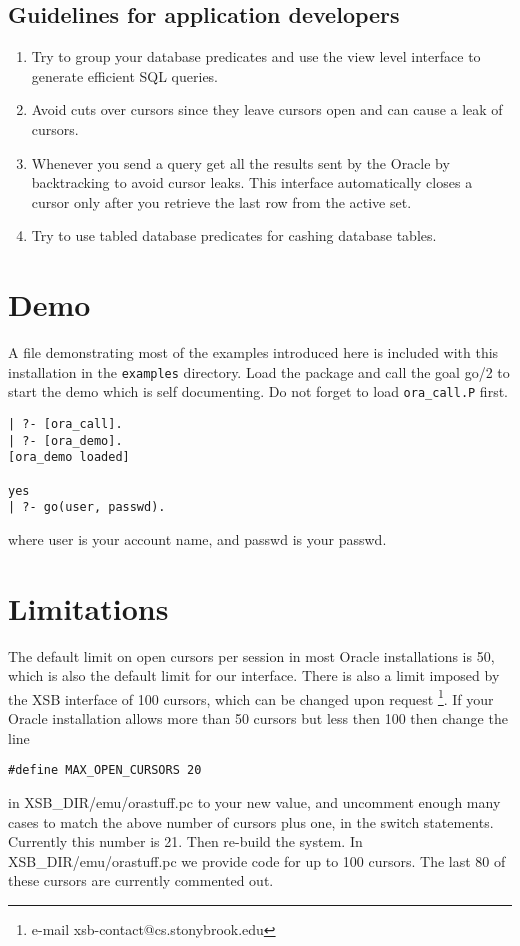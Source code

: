 \subsection{Guidelines for application developers} \label{sec:Guide}
\begin{enumerate}
\item  Try to group your database predicates and use the view level interface
   to generate efficient SQL queries.
\item  Avoid cuts over cursors since they leave cursors open and can cause
   a leak of cursors.
\item Whenever you send a query get all the results sent by the Oracle by
   backtracking to avoid cursor leaks.  This interface automatically closes a 
   cursor only after you retrieve the last row from the active set.
\item Try to use tabled database predicates for cashing database tables.
\end{enumerate}



\section{Demo}
A file demonstrating most of the examples introduced here is included
with this installation in the {\tt examples} directory.  Load the
package and call the goal go/2 to start the demo which is self
documenting.  Do not forget to load {\tt ora\_call.P} first.

\begin{verbatim}
| ?- [ora_call].
| ?- [ora_demo].
[ora_demo loaded]

yes
| ?- go(user, passwd).
\end{verbatim}
where user is your account name, and passwd is your passwd.


\section{Limitations} \label{oracle:limitations}
The default limit on open cursors per session in most Oracle
installations is 50, which is also the default limit for our
interface.  There is also a limit imposed by the XSB interface of 100
cursors, which can be changed upon request
\footnote{e-mail xsb-contact@cs.stonybrook.edu}.
If your Oracle installation allows more than 50 cursors but
less then 100 then change the line 
\begin{verbatim} 
#define MAX_OPEN_CURSORS 20 
\end{verbatim} 
in XSB\_DIR/emu/orastuff.pc to your new value, and uncomment enough
many cases to match the above number of cursors plus one, in the switch
statements. Currently this number is 21. Then re-build the system. In 
XSB\_DIR/emu/orastuff.pc we provide code for up to 100 cursors. The last
80 of these cursors are currently commented out.


